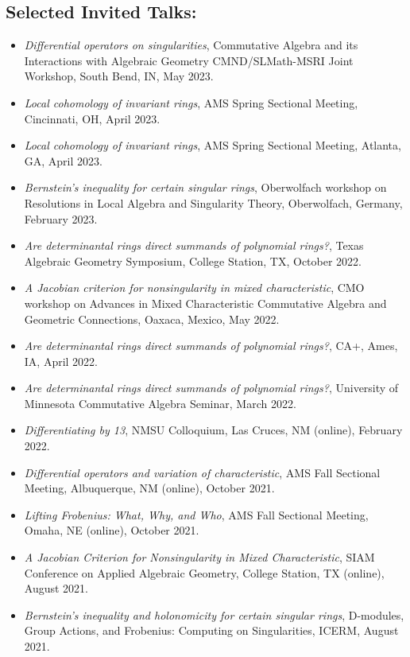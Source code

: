 \documentclass[12pt]{amsart}
\begin{document}
\subsection*{Selected Invited Talks:}
\begin{itemize}[leftmargin=9mm]
\item \emph{Differential operators on singularities}, Commutative Algebra and its Interactions with Algebraic Geometry CMND/SLMath-MSRI Joint Workshop, South Bend, IN, May 2023.
\item \emph{Local cohomology of invariant rings}, AMS Spring Sectional Meeting, Cincinnati, OH, April 2023.
\item \emph{Local cohomology of invariant rings}, AMS Spring Sectional Meeting, Atlanta, GA, April 2023.
\item \emph{Bernstein’s inequality for certain singular rings}, Oberwolfach workshop on Resolutions in Local Algebra and Singularity Theory, Oberwolfach, Germany, February 2023.
\item \emph{Are determinantal rings direct summands of polynomial rings?}, Texas Algebraic Geometry Symposium, College Station, TX, October 2022.
\item \emph{A Jacobian criterion for nonsingularity in mixed characteristic}, CMO workshop on Advances in Mixed Characteristic Commutative Algebra and Geometric Connections, Oaxaca, Mexico, May 2022.
\item \emph{Are determinantal rings direct summands of polynomial rings?}, CA+, Ames, IA, April 2022.
\item \emph{Are determinantal rings direct summands of polynomial rings?}, University of Minnesota Commutative Algebra Seminar, March 2022.
\item \emph{Differentiating by 13}, NMSU Colloquium, Las Cruces, NM (online), February 2022.
\item \emph{Differential operators and variation of characteristic}, AMS Fall Sectional Meeting, Albuquerque, NM (online), October 2021.
\item \emph{Lifting Frobenius: What, Why, and Who}, AMS Fall Sectional Meeting, Omaha, NE (online), October 2021.
\item \emph{A Jacobian Criterion for Nonsingularity in Mixed Characteristic},  SIAM Conference on Applied Algebraic Geometry, College Station, TX (online), August 2021. 
\item \emph{Bernstein's inequality and holonomicity for certain singular rings},  D-modules, Group Actions, and Frobenius: Computing on Singularities, ICERM, August 2021. 

\end{itemize}
\end{document}
